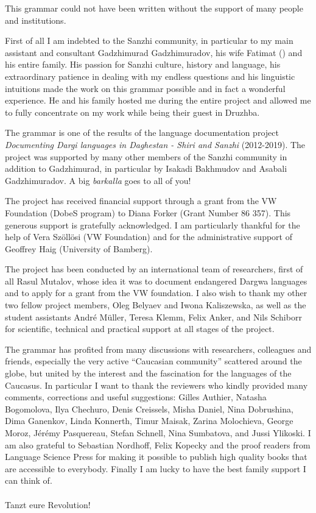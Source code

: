 

This grammar could not have been written without the support of many people and institutions.

First of all I am indebted to the Sanzhi community, in particular to my main assistant and consultant Gadzhimurad Gadzhimuradov, his wife Fatimat () and his entire family. His passion for Sanzhi culture, history and language, his extraordinary patience in dealing with my endless questions and his linguistic intuitions made the work on this grammar possible and in fact a wonderful experience. He and his family hosted me during the entire project and allowed me to fully concentrate on my work while being their guest in Druzhba.

The grammar is one of the results of the language documentation project \textit{Documenting Dargi languages in Daghestan - Shiri and Sanzhi} (2012-2019). The project was supported by many other members of the Sanzhi community in addition to Gadzhimurad, in particular by Isakadi Bakhmudov and Asabali Gadzhimuradov. A big \textit{barkalla} goes to all of you!

The project has received financial support through a grant from the VW Foundation (DobeS program) to Diana Forker (Grant Number 86 357). This generous support is gratefully acknowledged. I am particularly thankful for the help of Vera Szöllösi (VW Foundation) and for the administrative support of Geoffrey Haig (University of Bamberg).

The project has been conducted by an international team of researchers, first of all Rasul Mutalov, whose idea it was to document endangered Dargwa languages and to apply for a grant from the VW foundation. I also wish to thank my other two fellow project members, Oleg Belyaev and Iwona Kaliszewska, as well as the student assistants André Müller, Teresa Klemm, Felix Anker, and Nils Schiborr for scientific, technical and practical support at all stages of the project.

The grammar has profited from many discussions with researchers, colleagues and friends, especially the very active ``Caucasian community'' scattered around the globe, but united by the interest and the fascination for the languages of the Caucasus. In particular I want to thank the reviewers who kindly provided many comments, corrections and useful suggestions: Gilles Authier, Natasha Bogomolova, Ilya Chechuro, Denis Creissels, Misha Daniel, Nina Dobrushina, Dima Ganenkov, Linda Konnerth, Timur Maisak, Zarina Molochieva, George Moroz, Jérémy Pasquereau, Stefan Schnell, Nina Sumbatova, and Jussi Ylikoski. I am also grateful to Sebastian Nordhoff, Felix Kopecky and the proof readers from Language Science Press for making it possible to publish high quality books that are accessible to everybody. Finally I am lucky to have the best family support I can think of.
\\\\
Tanzt eure Revolution!



 



